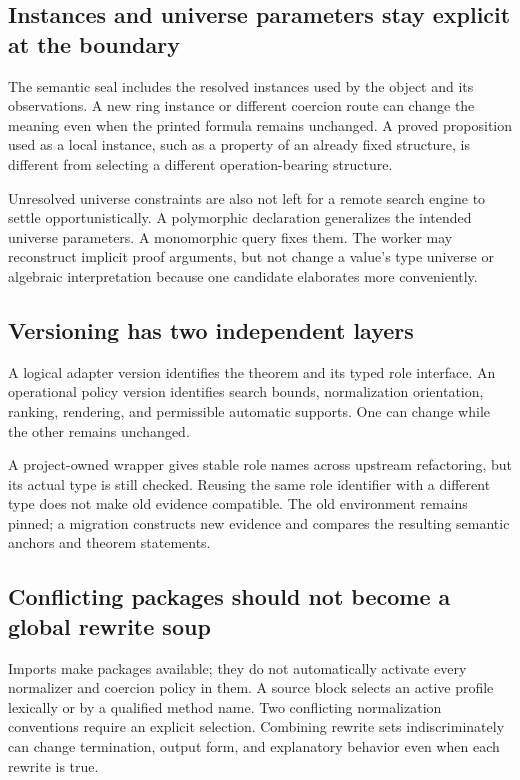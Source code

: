 \documentclass[11pt,a4paper]{article}
\theoremstyle{definition}
\begin{document}
\subsection{Instances and universe parameters stay explicit at the boundary}
The semantic seal includes the resolved instances used by the object and its
observations. A new ring instance or different coercion route can change the
meaning even when the printed formula remains unchanged. A proved proposition
used as a local instance, such as a property of an already fixed structure, is
different from selecting a different operation-bearing structure.

Unresolved universe constraints are also not left for a remote search engine
to settle opportunistically. A polymorphic declaration generalizes the intended
universe parameters. A monomorphic query fixes them. The worker may reconstruct
implicit proof arguments, but not change a value's type universe or algebraic
interpretation because one candidate elaborates more conveniently.

\subsection{Versioning has two independent layers}
A logical adapter version identifies the theorem and its typed role interface.
An operational policy version identifies search bounds, normalization orientation,
ranking, rendering, and permissible automatic supports. One can change while the
other remains unchanged.

A project-owned wrapper gives stable role names across upstream refactoring, but
its actual type is still checked. Reusing the same role identifier with a different
type does not make old evidence compatible. The old environment remains pinned;
a migration constructs new evidence and compares the resulting semantic anchors
and theorem statements.

\subsection{Conflicting packages should not become a global rewrite soup}
Imports make packages available; they do not automatically activate every
normalizer and coercion policy in them. A source block selects an active profile
lexically or by a qualified method name. Two conflicting normalization conventions
require an explicit selection. Combining rewrite sets indiscriminately can change
termination, output form, and explanatory behavior even when each rewrite is true.
\end{document}
